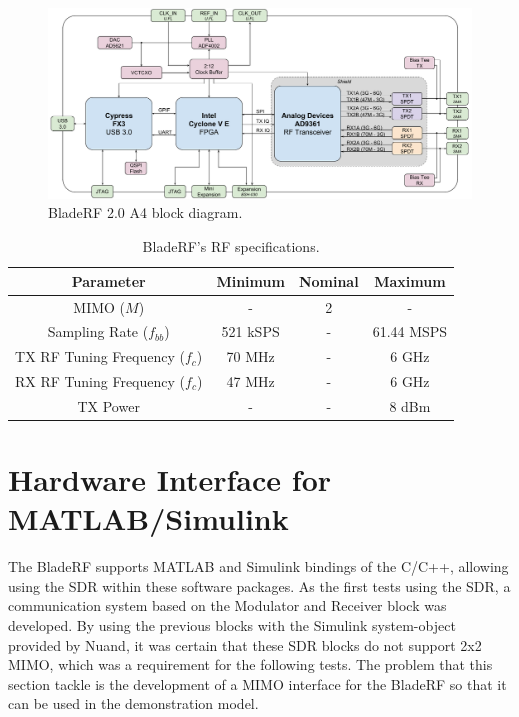 \documentclass[12pt,a4paper]{report}
\begin{document}
\begin{figure}
    \centering
    \includegraphics[width = \textwidth]{Figures/bladerf_bd.png}
    \caption{BladeRF 2.0 A4 block diagram. \cite{Nuand2018BladeRFMicro}}
    \label{fig:bladerf}
\end{figure}



\begin{table}
    \centering
    \begin{tabular}{c|c|c|c}
        Parameter & Minimum & Nominal & Maximum \\ \hline
        MIMO ($M$) & - & 2 & - \\ 
        Sampling Rate ($f_{bb}$) & 521 kSPS & - & 61.44 MSPS \\ 
         TX RF Tuning Frequency ($f_c$) & 70 MHz & - & 6 GHz \\ 
         RX RF Tuning Frequency ($f_c$) & 47 MHz & - & 6 GHz \\ 
         TX Power & - & - & 8 dBm \\
    \end{tabular}
    \caption{BladeRF's RF specifications. \cite{Nuand2018BladeRFMicro}}
    \label{tab:bladerf}
\end{table}

\newpage
\section{Hardware Interface for MATLAB/Simulink} \label{met:int}
The BladeRF supports MATLAB and Simulink bindings of the C/C++, allowing using the SDR within these software packages. As the first tests using the SDR, a communication system based on the Modulator and Receiver block was developed. By using the previous blocks with the Simulink system-object provided by Nuand, it was certain that these SDR blocks do not support 2x2 MIMO, which was a requirement for the following tests. The problem that this section tackle is the development of a MIMO interface for the BladeRF so that it can be used in the demonstration model. 
\end{document}
